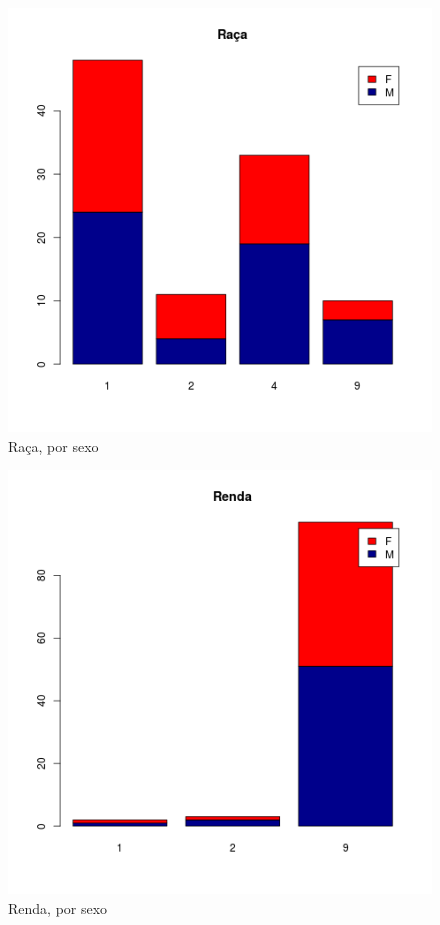 \documentclass[a4paper]{article}
\begin{document}
\begin{figure}[!h]
  \centering
  \includegraphics[width=.5\textwidth]{../figuras/raca-barplot}
  \caption{Raça, por sexo}
  \label{fig:raca-barplot}
\end{figure}

\begin{figure}[!h]
  \centering
  \includegraphics[width=.5\textwidth]{../figuras/renda-barplot}
  \caption{Renda, por sexo}
  \label{fig:renda-barplot}
\end{figure}
\end{document}
